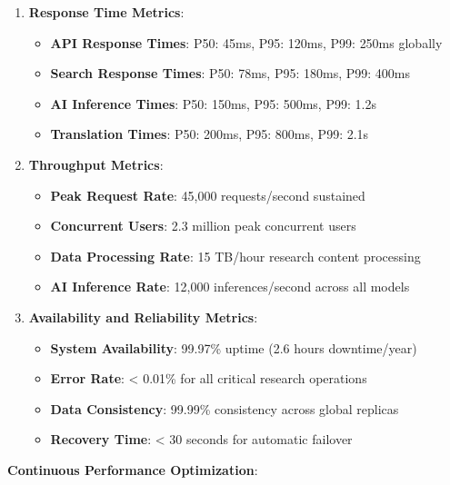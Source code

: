 \documentclass[10pt,twocolumn]{article}
\begin{document}
\begin{enumerate}
    \item \textbf{Response Time Metrics}:
    \begin{itemize}
        \item \textbf{API Response Times}: P50: 45ms, P95: 120ms, P99: 250ms globally
        \item \textbf{Search Response Times}: P50: 78ms, P95: 180ms, P99: 400ms
        \item \textbf{AI Inference Times}: P50: 150ms, P95: 500ms, P99: 1.2s
        \item \textbf{Translation Times}: P50: 200ms, P95: 800ms, P99: 2.1s
    \end{itemize}
    
    \item \textbf{Throughput Metrics}:
    \begin{itemize}
        \item \textbf{Peak Request Rate}: 45,000 requests/second sustained
        \item \textbf{Concurrent Users}: 2.3 million peak concurrent users
        \item \textbf{Data Processing Rate}: 15 TB/hour research content processing
        \item \textbf{AI Inference Rate}: 12,000 inferences/second across all models
    \end{itemize}
    
    \item \textbf{Availability and Reliability Metrics}:
    \begin{itemize}
        \item \textbf{System Availability}: 99.97\% uptime (2.6 hours downtime/year)
        \item \textbf{Error Rate}: < 0.01\% for all critical research operations
        \item \textbf{Data Consistency}: 99.99\% consistency across global replicas
        \item \textbf{Recovery Time}: < 30 seconds for automatic failover
    \end{itemize}
\end{enumerate}

\textbf{Continuous Performance Optimization}:
\end{document}
